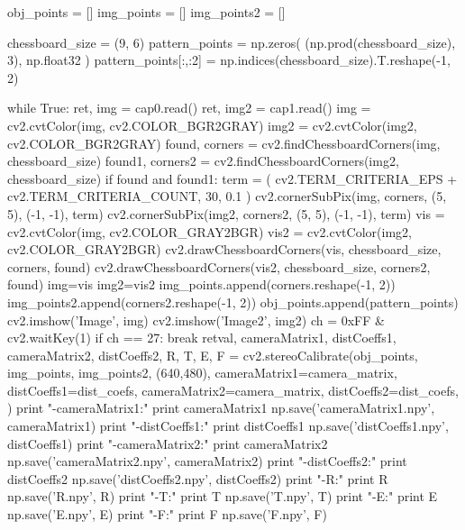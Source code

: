 \documentclass{article}
\begin{document}
\begin{python}
obj_points = []
img_points = []
img_points2 = []

chessboard_size = (9, 6)
pattern_points = np.zeros( (np.prod(chessboard_size), 3), np.float32 )
pattern_points[:,:2] = np.indices(chessboard_size).T.reshape(-1, 2)

while True:
	ret, img = cap0.read()
	ret, img2 = cap1.read()
	img = cv2.cvtColor(img, cv2.COLOR_BGR2GRAY)
	img2 = cv2.cvtColor(img2, cv2.COLOR_BGR2GRAY)
	found, corners = cv2.findChessboardCorners(img, chessboard_size)
	found1, corners2 = cv2.findChessboardCorners(img2, chessboard_size)
	if found and found1:
		term = ( cv2.TERM_CRITERIA_EPS + cv2.TERM_CRITERIA_COUNT, 30, 0.1 )
		cv2.cornerSubPix(img, corners, (5, 5), (-1, -1), term)
		cv2.cornerSubPix(img2, corners2, (5, 5), (-1, -1), term)
		vis = cv2.cvtColor(img, cv2.COLOR_GRAY2BGR)
		vis2 = cv2.cvtColor(img2, cv2.COLOR_GRAY2BGR)
		cv2.drawChessboardCorners(vis, chessboard_size, corners, found)
		cv2.drawChessboardCorners(vis2, chessboard_size, corners2, found)
		img=vis
		img2=vis2
		img_points.append(corners.reshape(-1, 2))
		img_points2.append(corners2.reshape(-1, 2))
		obj_points.append(pattern_points)
	cv2.imshow('Image', img)
	cv2.imshow('Image2', img2)
	ch = 0xFF & cv2.waitKey(1)
	if ch == 27:
		break	
retval, cameraMatrix1, distCoeffs1, cameraMatrix2, distCoeffs2, R, T, E, F = cv2.stereoCalibrate(obj_points,
																							img_points,
																							img_points2,
																							(640,480),
																							cameraMatrix1=camera_matrix,
																							distCoeffs1=dist_coefs,
																							cameraMatrix2=camera_matrix,
																							distCoeffs2=dist_coefs,
																							)
print "-cameraMatrix1:"
print cameraMatrix1
np.save('cameraMatrix1.npy', cameraMatrix1)
print "-distCoeffs1:"
print distCoeffs1
np.save('distCoeffs1.npy', distCoeffs1)
print "-cameraMatrix2:"
print cameraMatrix2
np.save('cameraMatrix2.npy', cameraMatrix2)
print "-distCoeffs2:"
print distCoeffs2
np.save('distCoeffs2.npy', distCoeffs2)
print "-R:"
print R
np.save('R.npy', R)
print "-T:"
print T
np.save('T.npy', T)
print "-E:"
print E
np.save('E.npy', E)
print "-F:"
print F
np.save('F.npy', F)


\end{python}

\newpage

\end{document}
